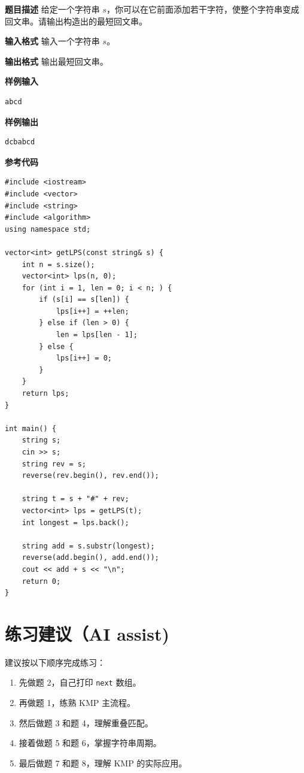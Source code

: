 \documentclass[12pt,a4paper]{article}
\begin{document}
\textbf{题目描述}  
给定一个字符串 $s$，你可以在它前面添加若干字符，使整个字符串变成回文串。请输出构造出的最短回文串。

\textbf{输入格式}  
输入一个字符串 $s$。

\textbf{输出格式}  
输出最短回文串。

\textbf{样例输入}
\begin{lstlisting}
abcd
\end{lstlisting}

\textbf{样例输出}
\begin{lstlisting}
dcbabcd
\end{lstlisting}

\textbf{参考代码}
\begin{lstlisting}
#include <iostream>
#include <vector>
#include <string>
#include <algorithm>
using namespace std;

vector<int> getLPS(const string& s) {
    int n = s.size();
    vector<int> lps(n, 0);
    for (int i = 1, len = 0; i < n; ) {
        if (s[i] == s[len]) {
            lps[i++] = ++len;
        } else if (len > 0) {
            len = lps[len - 1];
        } else {
            lps[i++] = 0;
        }
    }
    return lps;
}

int main() {
    string s;
    cin >> s;
    string rev = s;
    reverse(rev.begin(), rev.end());

    string t = s + "#" + rev;
    vector<int> lps = getLPS(t);
    int longest = lps.back();

    string add = s.substr(longest);
    reverse(add.begin(), add.end());
    cout << add + s << "\n";
    return 0;
}
\end{lstlisting}

\section{练习建议（AI assist)}
建议按以下顺序完成练习：

\begin{enumerate}
    \item 先做题 2，自己打印 \texttt{next} 数组。
    \item 再做题 1，练熟 KMP 主流程。
    \item 然后做题 3 和题 4，理解重叠匹配。
    \item 接着做题 5 和题 6，掌握字符串周期。
    \item 最后做题 7 和题 8，理解 KMP 的实际应用。
\end{enumerate}
\end{document}
